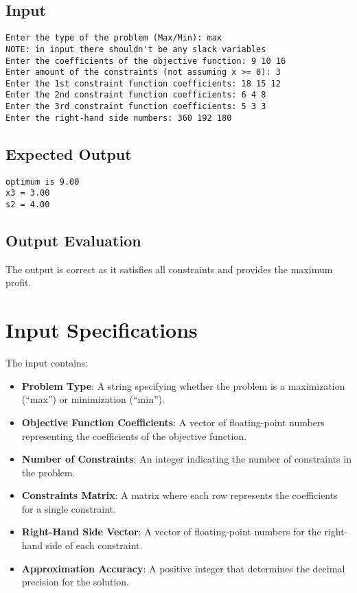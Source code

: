 \documentclass[12pt, legalpaper]{exam}
\begin{document}
 
\subsection*{Input}
\begin{verbatim}
Enter the type of the problem (Max/Min): max
NOTE: in input there shouldn't be any slack variables
Enter the coefficients of the objective function: 9 10 16
Enter amount of the constraints (not assuming x >= 0): 3
Enter the 1st constraint function coefficients: 18 15 12
Enter the 2nd constraint function coefficients: 6 4 8
Enter the 3rd constraint function coefficients: 5 3 3
Enter the right-hand side numbers: 360 192 180
\end{verbatim}
 
\subsection*{Expected Output}
\begin{verbatim}
optimum is 9.00
x3 = 3.00
s2 = 4.00
\end{verbatim}
 
\subsection*{Output Evaluation}
The output is correct as it satisfies all constraints and provides the maximum profit.
 
\vspace{12pt}

\section*{Input Specifications}

The input contains:
\begin{itemize}
    \item \textbf{Problem Type}: A string specifying whether the problem is a maximization (``max'') or minimization (``min'').
    \item \textbf{Objective Function Coefficients}: A vector of floating-point numbers representing the coefficients of the objective function.
    \item \textbf{Number of Constraints}: An integer indicating the number of constraints in the problem.
    \item \textbf{Constraints Matrix}: A matrix where each row represents the coefficients for a single constraint.
    \item \textbf{Right-Hand Side Vector}: A vector of floating-point numbers for the right-hand side of each constraint.
    \item \textbf{Approximation Accuracy}: A positive integer that determines the decimal precision for the solution.
\end{itemize}
\end{document}
